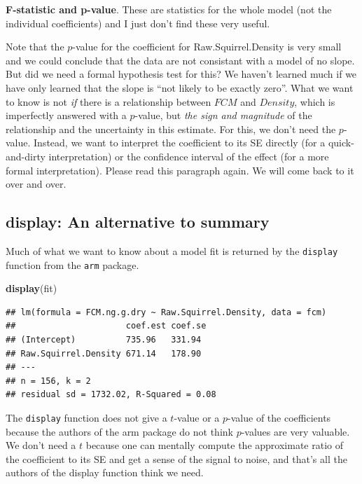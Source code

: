 \documentclass[]{book}
\newenvironment{Shaded}{\begin{snugshade}}{\end{snugshade}}
\newcommand{\KeywordTok}[1]{\textcolor[rgb]{0.13,0.29,0.53}{\textbf{#1}}}
\newcommand{\NormalTok}[1]{#1}
\begin{document}
\textbf{F-statistic and p-value}. These are statistics for the whole
model (not the individual coefficients) and I just don't find these very
useful.

Note that the \(p\)-value for the coefficient for Raw.Squirrel.Density
is very small and we could conclude that the data are not consistant
with a model of no slope. But did we need a formal hypothesis test for
this? We haven't learned much if we have only learned that the slope is
``not likely to be exactly zero''. What we want to know is not \emph{if}
there is a relationship between \(FCM\) and \(Density\), which is
imperfectly answered with a \(p\)-value, but \emph{the sign and
magnitude} of the relationship and the uncertainty in this estimate. For
this, we don't need the \(p\)-value. Instead, we want to interpret the
coefficient to its SE directly (for a quick-and-dirty interpretation) or
the confidence interval of the effect (for a more formal
interpretation). Please read this paragraph again. We will come back to
it over and over.

\subsection{display: An alternative to
summary}\label{display-an-alternative-to-summary}

Much of what we want to know about a model fit is returned by the
\texttt{display} function from the \texttt{arm} package.

\begin{Shaded}
\begin{Highlighting}[]
\KeywordTok{display}\NormalTok{(fit)}
\end{Highlighting}
\end{Shaded}

\begin{verbatim}
## lm(formula = FCM.ng.g.dry ~ Raw.Squirrel.Density, data = fcm)
##                      coef.est coef.se
## (Intercept)          735.96   331.94 
## Raw.Squirrel.Density 671.14   178.90 
## ---
## n = 156, k = 2
## residual sd = 1732.02, R-Squared = 0.08
\end{verbatim}

The \texttt{display} function does not give a \(t\)-value or a
\(p\)-value of the coefficients because the authors of the arm package
do not think \(p\)-values are very valuable. We don't need a \(t\)
because one can mentally compute the approximate ratio of the
coefficient to its SE and get a sense of the signal to noise, and that's
all the authors of the display function think we need.
\end{document}
